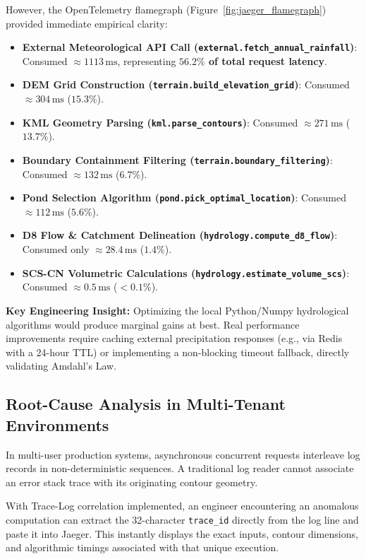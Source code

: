 \documentclass[11pt,a4paper]{article}
\begin{document}
However, the OpenTelemetry flamegraph (Figure~\ref{fig:jaeger_flamegraph}) provided immediate empirical clarity:
\begin{itemize}[leftmargin=*]
    \item \textbf{External Meteorological API Call (\texttt{external.fetch\_annual\_rainfall})}: Consumed $\approx 1113\,\text{ms}$, representing \textbf{$56.2\%$ of total request latency}.
    \item \textbf{DEM Grid Construction (\texttt{terrain.build\_elevation\_grid})}: Consumed $\approx 304\,\text{ms}$ ($15.3\%$).
    \item \textbf{KML Geometry Parsing (\texttt{kml.parse\_contours})}: Consumed $\approx 271\,\text{ms}$ ($13.7\%$).
    \item \textbf{Boundary Containment Filtering (\texttt{terrain.boundary\_filtering})}: Consumed $\approx 132\,\text{ms}$ ($6.7\%$).
    \item \textbf{Pond Selection Algorithm (\texttt{pond.pick\_optimal\_location})}: Consumed $\approx 112\,\text{ms}$ ($5.6\%$).
    \item \textbf{D8 Flow \& Catchment Delineation (\texttt{hydrology.compute\_d8\_flow})}: Consumed only $\approx 28.4\,\text{ms}$ ($1.4\%$).
    \item \textbf{SCS-CN Volumetric Calculations (\texttt{hydrology.estimate\_volume\_scs})}: Consumed $\approx 0.5\,\text{ms}$ ($<0.1\%$).
\end{itemize}

\begin{summarybox}
    \textbf{\color{primary}Key Engineering Insight:} Optimizing the local Python/Numpy hydrological algorithms would produce marginal gains at best. Real performance improvements require caching external precipitation responses (e.g., via Redis with a 24-hour TTL) or implementing a non-blocking timeout fallback, directly validating Amdahl's Law.
\end{summarybox}

\subsection{Root-Cause Analysis in Multi-Tenant Environments}
In multi-user production systems, asynchronous concurrent requests interleave log records in non-deterministic sequences. A traditional log reader cannot associate an error stack trace with its originating contour geometry. 

With Trace-Log correlation implemented, an engineer encountering an anomalous computation can extract the 32-character \texttt{trace\_id} directly from the log line and paste it into Jaeger. This instantly displays the exact inputs, contour dimensions, and algorithmic timings associated with that unique execution.
\end{document}
